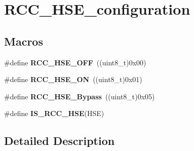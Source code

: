 \hypertarget{group___r_c_c___h_s_e__configuration}{\section{R\-C\-C\-\_\-\-H\-S\-E\-\_\-configuration}
\label{group___r_c_c___h_s_e__configuration}
}
\subsection*{Macros}
\begin{DoxyCompactItemize}
\item 
\hypertarget{group___r_c_c___h_s_e__configuration_ga1616626d23fbce440398578855df6f97}{\#define {\bfseries R\-C\-C\-\_\-\-H\-S\-E\-\_\-\-O\-F\-F}~((uint8\-\_\-t)0x00)}\label{group___r_c_c___h_s_e__configuration_ga1616626d23fbce440398578855df6f97}

\item 
\hypertarget{group___r_c_c___h_s_e__configuration_gabc4f70a44776c557af20496b04d9a9db}{\#define {\bfseries R\-C\-C\-\_\-\-H\-S\-E\-\_\-\-O\-N}~((uint8\-\_\-t)0x01)}\label{group___r_c_c___h_s_e__configuration_gabc4f70a44776c557af20496b04d9a9db}

\item 
\hypertarget{group___r_c_c___h_s_e__configuration_ga09061e9909d5f588baa7bfb0f7edd9fa}{\#define {\bfseries R\-C\-C\-\_\-\-H\-S\-E\-\_\-\-Bypass}~((uint8\-\_\-t)0x05)}\label{group___r_c_c___h_s_e__configuration_ga09061e9909d5f588baa7bfb0f7edd9fa}

\item 
\#define {\bfseries I\-S\-\_\-\-R\-C\-C\-\_\-\-H\-S\-E}(H\-S\-E)
\end{DoxyCompactItemize}


\subsection{Detailed Description}



